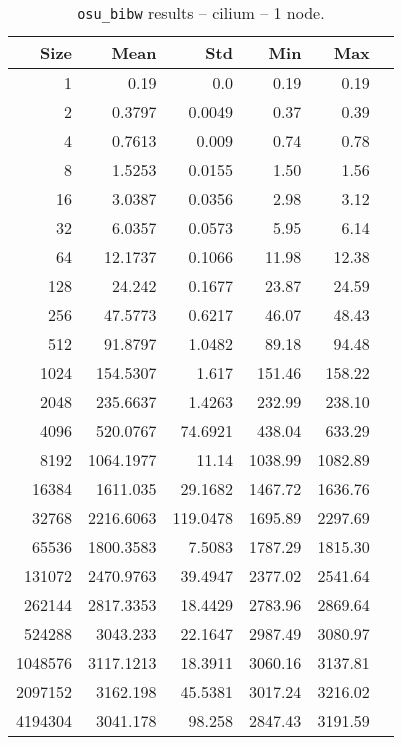 
\begin{table}[htbp]
  \centering
  \begin{minipage}{.48\textwidth}
    \centering
    \footnotesize
  \begin{tabular}{rrrrrr}
	\toprule
	\textbf{Size} & \textbf{Mean} & \textbf{Std} & \textbf{Min} & \textbf{Max}	\\
	\midrule
	1	&	0.19   	&	0.0	&	0.19	&	0.19	\\
	2	&	0.3797   	&	0.0049	&	0.37	&	0.39	\\
	4	&	0.7613   	&	0.009	&	0.74	&	0.78	\\
	8	&	1.5253   	&	0.0155	&	1.50	&	1.56	\\
	16	&	3.0387   	&	0.0356	&	2.98	&	3.12	\\
	32	&	6.0357   	&	0.0573	&	5.95	&	6.14	\\
	64	&	12.1737   	&	0.1066	&	11.98	&	12.38	\\
	128	&	24.242   	&	0.1677	&	23.87	&	24.59	\\
	256	&	47.5773   	&	0.6217	&	46.07	&	48.43	\\
	512	&	91.8797   	&	1.0482	&	89.18	&	94.48	\\
	1024	&	154.5307   	&	1.617	&	151.46	&	158.22	\\
	2048	&	235.6637   	&	1.4263	&	232.99	&	238.10	\\
	4096	&	520.0767   	&	74.6921	&	438.04	&	633.29	\\
	8192	&	1064.1977   	&	11.14	&	1038.99	&	1082.89	\\
	16384	&	1611.035   	&	29.1682	&	1467.72	&	1636.76	\\
	32768	&	2216.6063   	&	119.0478	&	1695.89	&	2297.69	\\
	65536	&	1800.3583   	&	7.5083	&	1787.29	&	1815.30	\\
	131072	&	2470.9763   	&	39.4947	&	2377.02	&	2541.64	\\
	262144	&	2817.3353   	&	18.4429	&	2783.96	&	2869.64	\\
	524288	&	3043.233   	&	22.1647	&	2987.49	&	3080.97	\\
	1048576	&	3117.1213   	&	18.3911	&	3060.16	&	3137.81	\\
	2097152	&	3162.198   	&	45.5381	&	3017.24	&	3216.02	\\
	4194304	&	3041.178   	&	98.258	&	2847.43	&	3191.59	\\
	\bottomrule
	\end{tabular}
  \caption{\texttt{osu\_bibw} results -- cilium -- 1 node.}

\end{minipage}
\end{table}
